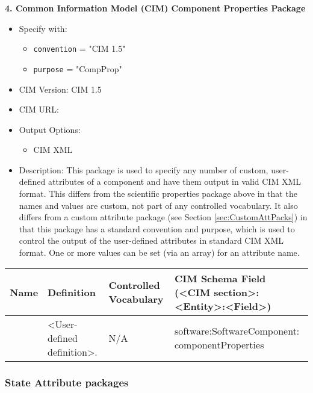 \vspace{.20in}

{\bf 4. Common Information Model (CIM) Component Properties Package}

\begin{itemize}
    \item Specify with:
    \begin{itemize}
        \item {\tt convention} = "CIM 1.5"
        \item {\tt purpose} = "CompProp"
    \end{itemize}
    \item CIM Version: CIM 1.5
    \item CIM URL: 
    \item Output Options:
    \begin{itemize}
        \item CIM XML
    \end{itemize}
    \item Description: This package is used to specify any number of custom, user-defined attributes of a component and have them output in valid CIM XML format.  This differs from the scientific properties package above in that the names and values are custom, not part of any controlled vocabulary.  It also differs from a custom attribute package (see Section \ref{sec:CustomAttPacks}) in that this package has a standard convention and purpose, which is used to control the output of the user-defined attributes in standard CIM XML format.  One or more values can be set (via an array) for an attribute name.
\end{itemize}

\begin{longtable}{|p{6cm}|p{2cm}|p{1.5cm}|p{6.5cm}|}
     \hline\hline
     {\bf Name} & {\bf Definition} & {\bf Controlled Vocabulary} & {\bf CIM Schema Field (<CIM section>:<Entity>:<Field>)}\\
     \hline\hline
     {\tt <User-defined name>} & <User-defined definition>. & N/A & software:SoftwareComponent: componentProperties \\
     \hline\hline
\end{longtable}

\vspace{.20in}

\subsubsection{State Attribute packages}
\label{StateAttributePackages}

